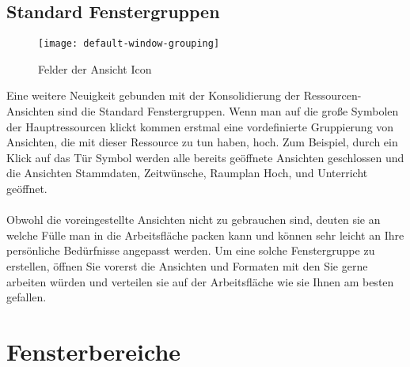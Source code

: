 \newpage

\subsection{Standard Fenstergruppen}

\begin{wrapfigure}{r}{0.4\textwidth}
	\vspace{-14pt}
	\texttt{[image: default-window-grouping]}
	\vspace{-5pt}
	\caption{Felder der Ansicht Icon}
	\label{fig:default-window-grouping}
	\vspace{-10pt}
\end{wrapfigure}

Eine weitere Neuigkeit gebunden mit der Konsolidierung der Ressourcen-Ansichten sind die Standard Fenstergruppen. Wenn man auf die große Symbolen der Hauptressourcen klickt kommen erstmal eine vordefinierte Gruppierung von Ansichten, die mit dieser Ressource zu tun haben, hoch. Zum Beispiel, durch ein Klick auf das Tür Symbol werden alle bereits geöffnete Ansichten geschlossen und die Ansichten Stammdaten, Zeitwünsche, Raumplan Hoch, und Unterricht geöffnet.\\
\\
Obwohl die voreingestellte Ansichten nicht zu gebrauchen sind, deuten sie an welche Fülle man in die Arbeitsfläche packen kann und können sehr leicht an Ihre persönliche Bedürfnisse angepasst werden. Um eine solche Fenstergruppe zu erstellen, öffnen Sie vorerst die Ansichten und Formaten mit den Sie gerne arbeiten würden und verteilen sie auf der Arbeitsfläche wie sie Ihnen am besten gefallen.\\

\section{Fensterbereiche}

